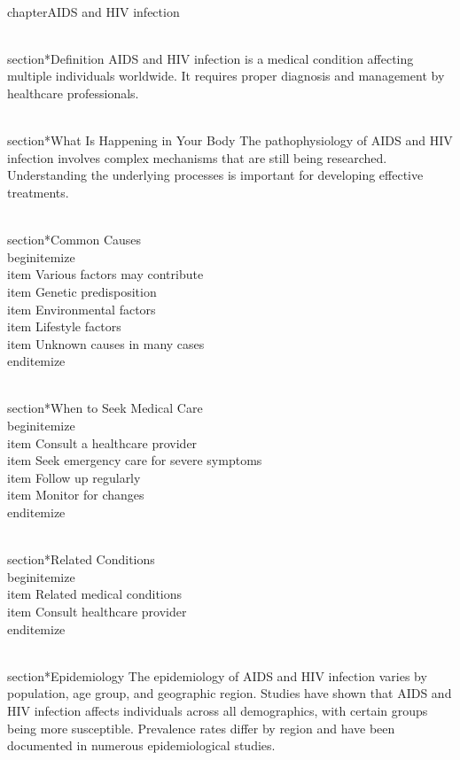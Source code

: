 
\\chapter{AIDS and HIV infection}

\\section*{Definition}
AIDS and HIV infection is a medical condition affecting multiple individuals worldwide. It requires proper diagnosis and management by healthcare professionals.

\\section*{What Is Happening in Your Body}
The pathophysiology of AIDS and HIV infection involves complex mechanisms that are still being researched. Understanding the underlying processes is important for developing effective treatments.

\\section*{Common Causes}
\\begin{itemize}
\\item Various factors may contribute\n  \\item Genetic predisposition\n  \\item Environmental factors\n  \\item Lifestyle factors\n  \\item Unknown causes in many cases
\\end{itemize}

\\section*{When to Seek Medical Care}
\\begin{itemize}
\\item Consult a healthcare provider\n  \\item Seek emergency care for severe symptoms\n  \\item Follow up regularly\n  \\item Monitor for changes
\\end{itemize}

\\section*{Related Conditions}
\\begin{itemize}
\\item Related medical conditions\n  \\item Consult healthcare provider
\\end{itemize}

\\section*{Epidemiology}
The epidemiology of AIDS and HIV infection varies by population, age group, and geographic region. Studies have shown that AIDS and HIV infection affects individuals across all demographics, with certain groups being more susceptible. Prevalence rates differ by region and have been documented in numerous epidemiological studies.

